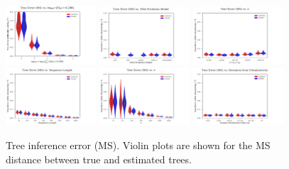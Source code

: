 \begin{figure} %
\centering
\includegraphics[width=0.3\textwidth]{figs/dualbirth-tree-ms-a}
\includegraphics[width=0.3\textwidth]{figs/dualbirth-tree-ms-b}
\includegraphics[width=0.3\textwidth]{figs/dualbirth-tree-ms-c}\\
\includegraphics[width=0.3\textwidth]{figs/dualbirth-tree-ms-d}
\includegraphics[width=0.3\textwidth]{figs/dualbirth-tree-ms-e}
\includegraphics[width=0.3\textwidth]{figs/dualbirth-tree-ms-f}
\caption[Matching Split Distance]
{Tree inference error (MS). Violin plots are shown for the MS distance between true and estimated trees.}
\label{fig:dualbirth-tree-ms}
\end{figure}

